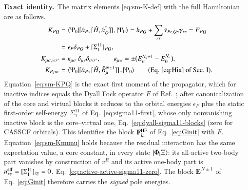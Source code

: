 \documentclass[aip,jcp,reprint,noshowkeys,superscriptaddress]{revtex4-1}
\newcommand{\bE}{\boldsymbol{E}}
\newcommand{\Exact}{\textbf{Exact identity.}\ }
\begin{document}
\Exact The matrix elements \eqref{eq:sm-K-def} with the full Hamiltonian
are as follows.
\begin{align}
  K_{PQ}&=\langle\Psi_0|[\hat a_P,[\hat H,\hat a_Q^\dagger]]_+|\Psi_0\rangle
  =h_{PQ}+\sum_{rs}\bar v_{Pr,Qs}\gamma_{rs}=F_{PQ}
  \nonumber\\
  &=\epsilon_P\delta_{PQ}+[\Sigma^{11}_1]_{PQ},
  \label{eq:sm-KPQ}\\
  K_{\mu\sigma,\nu\sigma'}&=\kappa_{\mu\sigma}\,\delta_{\mu\nu}\delta_{\sigma\sigma'},
  \qquad \kappa_{\mu\pm}=\pm\bigl(E^{N_a\pm1}_\mu-E^{N_a}_0\bigr),
  \label{eq:sm-Kmunu}\\
  K_{P,\mu\sigma}&=\langle\Psi_0|[\hat a_P,[\hat H,\hat R^{N\pm1}_\mu]]_+|\Psi_0\rangle
  \qquad(\text{Eq.~\eqref{eq:Hia} of Sec.~I}).
  \label{eq:sm-KPmu}
\end{align}
Equation~\eqref{eq:sm-KPQ} is the exact first moment of the propagator,
which for inactive indices equals the Dyall Fock operator $F$ of
Ref.~\cite{WangFangLi2026}; after canonicalization of the core and virtual
blocks it reduces to the orbital energies $\epsilon_P$ plus the static
first-order self-energy $\Sigma^{11}_1$ of Eq.~\eqref{eq:sigma11-first},
whose only nonvanishing inactive block is the core--virtual one,
Eq.~\eqref{eq:dyall-sigma11-blocks} (zero for CASSCF orbitals).  This
identifies the block $\mathbf{F}^{\rm HF}_{\rm i,i}$ of Eq.~\eqref{eq:Ginit} with
$F$.  Equation~\eqref{eq:sm-Kmunu} holds because the residual interaction has
the same expectation value, a core constant, in every state
$|\Phi_{\rm i}\Xi\rangle$: its all-active two-body part vanishes by
construction of $v^R$ and its active one-body part is
$u^{\rm eff}_{xy}=[\Sigma^{11}_1]_{xy}=0$,
Eq.~\eqref{eq:active-active-sigma11-zero}.  The block $\bE^{N\pm1}$ of
Eq.~\eqref{eq:Ginit} therefore carries the \emph{signed} pole energies.
\end{document}
